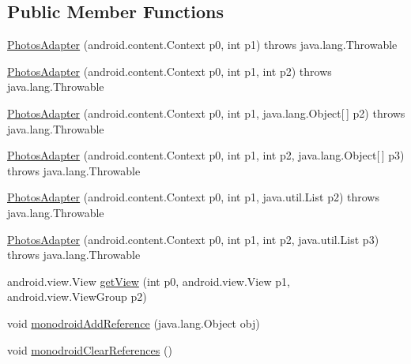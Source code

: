 \subsection*{Public Member Functions}
\begin{DoxyCompactItemize}
\item 
\hyperlink{classfieldservice_1_1android_1_1_photos_adapter_ae5e677b1817bd9d386073ce50b22abb4}{Photos\+Adapter} (android.\+content.\+Context p0, int p1)  throws java.\+lang.\+Throwable 	
\item 
\hyperlink{classfieldservice_1_1android_1_1_photos_adapter_ab23d211fa23ee3f460bb781b3e9924c7}{Photos\+Adapter} (android.\+content.\+Context p0, int p1, int p2)  throws java.\+lang.\+Throwable 	
\item 
\hyperlink{classfieldservice_1_1android_1_1_photos_adapter_a0e072232dc976cbd84907108a804d981}{Photos\+Adapter} (android.\+content.\+Context p0, int p1, java.\+lang.\+Object\mbox{[}$\,$\mbox{]} p2)  throws java.\+lang.\+Throwable 	
\item 
\hyperlink{classfieldservice_1_1android_1_1_photos_adapter_a57a4e6e5e582dc605ac0b63dccdf3308}{Photos\+Adapter} (android.\+content.\+Context p0, int p1, int p2, java.\+lang.\+Object\mbox{[}$\,$\mbox{]} p3)  throws java.\+lang.\+Throwable 	
\item 
\hyperlink{classfieldservice_1_1android_1_1_photos_adapter_a3728713205051b692a0bb721e67a4aba}{Photos\+Adapter} (android.\+content.\+Context p0, int p1, java.\+util.\+List p2)  throws java.\+lang.\+Throwable 	
\item 
\hyperlink{classfieldservice_1_1android_1_1_photos_adapter_ad75d613474ec960c2f35e11dcd51501a}{Photos\+Adapter} (android.\+content.\+Context p0, int p1, int p2, java.\+util.\+List p3)  throws java.\+lang.\+Throwable 	
\item 
android.\+view.\+View \hyperlink{classfieldservice_1_1android_1_1_photos_adapter_aa80a3a4152e74f7602884a104e45e7ab}{get\+View} (int p0, android.\+view.\+View p1, android.\+view.\+View\+Group p2)
\item 
void \hyperlink{classfieldservice_1_1android_1_1_photos_adapter_a2ec08da8b0c90ae974aeb4aa18b46c82}{monodroid\+Add\+Reference} (java.\+lang.\+Object obj)
\item 
void \hyperlink{classfieldservice_1_1android_1_1_photos_adapter_a2b368a9f9468a44310aa90729d3a14b2}{monodroid\+Clear\+References} ()
\end{DoxyCompactItemize}


